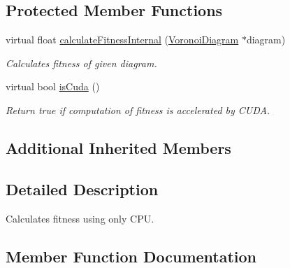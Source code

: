 \subsection*{Protected Member Functions}
\begin{DoxyCompactItemize}
\item 
virtual float \hyperlink{classlossycompressor_1_1_cpu_fitness_evaluator_a96a8323ab453f289d4ab8995ad74a380}{calculate\+Fitness\+Internal} (\hyperlink{structlossycompressor_1_1_voronoi_diagram}{Voronoi\+Diagram} $\ast$diagram)
\begin{DoxyCompactList}\small\item\em Calculates fitness of given diagram. \end{DoxyCompactList}\item 
virtual bool \hyperlink{classlossycompressor_1_1_cpu_fitness_evaluator_a0933b2bd259d2ad6e1bbe2b462df5963}{is\+Cuda} ()\hypertarget{classlossycompressor_1_1_cpu_fitness_evaluator_a0933b2bd259d2ad6e1bbe2b462df5963}{}\label{classlossycompressor_1_1_cpu_fitness_evaluator_a0933b2bd259d2ad6e1bbe2b462df5963}

\begin{DoxyCompactList}\small\item\em Return true if computation of fitness is accelerated by C\+U\+DA. \end{DoxyCompactList}\end{DoxyCompactItemize}
\subsection*{Additional Inherited Members}


\subsection{Detailed Description}
Calculates fitness using only C\+PU. 

\subsection{Member Function Documentation}
